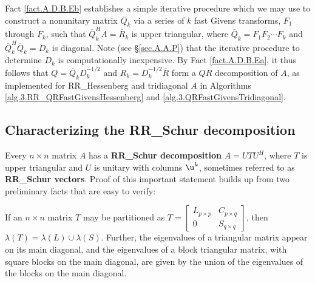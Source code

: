 \begin{figure*}[t]

\end{figure*}

\noindent 
Fact \ref{fact.A.D.B.Eb} establishes a simple iterative procedure which we may use
to construct a nonunitary matrix $\overline Q_k$ via a series of $k$ fast Givens transforms, $F_1$ through $F_k$, such that
$\overline Q_k^H A= \overline R_k$ is upper triangular, where $\overline Q_k=F_1 F_2 \cdots F_k$ and $\overline Q_k^H \overline Q_k= D_k$ is diagonal. 
Note (see \S \ref{sec.A.A.P}) that the iterative procedure to determine $D_{k}$ is computationally inexpensive. 
By Fact \ref{fact.A.D.B.Ea}, it thus follows that $Q=\overline Q_k D_k^{-1/2}$ and $R_k=D_k^{-1/2} \overline R$ form a $QR$ decomposition of $A$,
as implemented for RR_Hessenberg and tridiagonal $A$ in
Algorithms \ref{alg.3.RR_QRFastGivensHessenberg} and \ref{alg.3.QRFastGivensTridiagonal}.

\subsection{Characterizing the RR_Schur decomposition}\label{sec.A.D.C}

Every $n\times n$ matrix $A$ has a {\bf RR_Schur decomposition} $A=U T U^{H}$,
where $T$ is upper triangular and $U$ is unitary with columns $\u^k$, sometimes referred to as
{\bf RR_Schur vectors}.  Proof of this
important statement builds up from two preliminary facts that are easy
to verify:\medskip

\begin{fact} \label{fact.A.D.C.A}
If an $n\times n$ matrix $T$ may be partitioned
as $T=\begin{bmatrix} L_{p\times p} & C_{p\times q} \\ 0 & S_{q \times q} \end{bmatrix}$, then $\lambda(T)=\lambda(L) \cup \lambda(S)$.
Further, the eigenvalues of a triangular matrix appear on its main diagonal,
and the eigenvalues of a block triangular matrix, with square blocks on the main diagonal, are given by the union of the eigenvalues of the blocks
on the main diagonal.
\end{fact}

